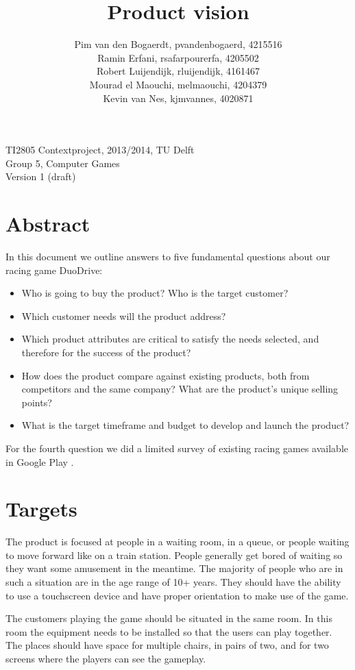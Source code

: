 \documentclass[11pt,twoside,a4paper]{article}
\title{Product vision}
\author{
	Pim van den Bogaerdt, pvandenbogaerd, 4215516\\
	Ramin Erfani, rsafarpourerfa, 4205502\\
	Robert Luijendijk, rluijendijk, 4161467\\
	Mourad el Maouchi, melmaouchi, 4204379\\
	Kevin van Nes, kjmvannes, 4020871
}
\begin{document}
\maketitle
\begin{center}
TI2805 Contextproject, 2013/2014, TU Delft\\
Group 5, Computer Games\\
Version 1 (draft)
\end{center}
\clearpage

\section*{Abstract}
In this document we outline answers to five fundamental questions \cite{pichler} about our racing game DuoDrive:

\begin{itemize}
\item Who is going to buy the product? Who is the target customer? 
\item Which customer needs will the product address? 
\item Which product attributes are critical to satisfy the needs selected, and therefore for the success of the product? 
\item How does the product compare against existing products, both from competitors and the same company? What are the product’s unique selling points? 
\item What is the target timeframe and budget to develop and launch the product?
\end{itemize}

For the fourth question we did a limited survey of existing racing games available in Google Play \cite{googleplay}.

\clearpage
\tableofcontents

\clearpage

\section{Targets}
The product is focused at people in a waiting room, in a queue, or people waiting to move forward like on a train station. People generally get bored of waiting so they want some amusement in the meantime. The majority of people who are in such a situation are in the age range of 10+ years. They should have the ability to use a touchscreen device and have proper orientation to make use of the game.

The customers playing the game should be situated in the same room. In this room the equipment needs to be installed so that the users can play together. The places should have space for multiple chairs, in pairs of two, and for two screens where the players can see the gameplay.
\end{document}
